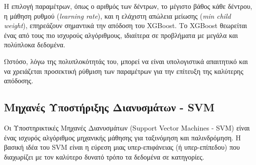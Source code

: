 \documentclass[diploma]{softlab-thesis}
\begin{document}
Η επιλογή παραμέτρων, όπως ο αριθμός των δέντρων, το μέγιστο βάθος κάθε δέντρου, η μάθηση ρυθμού (\textit{learning rate}), και η ελάχιστη απώλεια μείωσης (\textit{min child weight}), επηρεάζουν σημαντικά την απόδοση του XGBoost. Το XGBoost θεωρείται ένας από τους πιο ισχυρούς αλγόριθμους, ιδιαίτερα σε προβλήματα με μεγάλα και πολύπλοκα δεδομένα.

Ωστόσο, λόγω της πολυπλοκότητάς του, μπορεί να είναι υπολογιστικά απαιτητικό και να χρειάζεται προσεκτική ρύθμιση των παραμέτρων για την επίτευξη της καλύτερης απόδοσης.


\subsection{Μηχανές Υποστήριξης Διανυσμάτων - SVM}

Οι Υποστηρικτικές Μηχανές Διανυσμάτων (Support Vector Machines - SVM) είναι ένας ισχυρός αλγόριθμος μηχανικής μάθησης για ταξινόμηση και παλινδρόμηση. Η βασική ιδέα του SVM είναι η εύρεση μιας υπερ-επιφάνειας (ή υπερ-επίπεδου) που διαχωρίζει με τον καλύτερο δυνατό τρόπο τα δεδομένα σε κατηγορίες.
\end{document}

